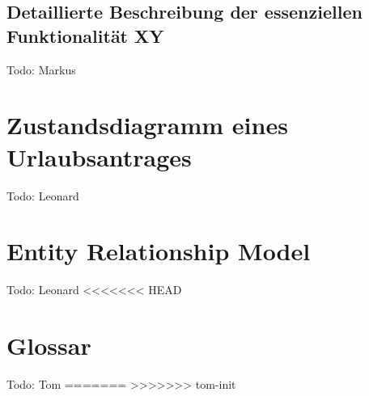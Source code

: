 \section{Detaillierte Beschreibung der essenziellen Funktionalität XY}
Todo: Markus
\chapter{Zustandsdiagramm eines Urlaubsantrages}
Todo: Leonard
\chapter{Entity Relationship Model}
Todo: Leonard
<<<<<<< HEAD
\chapter{Glossar}
Todo: Tom
=======
>>>>>>> tom-init

% 
% 

\clearpage
\thispagestyle{empty}


